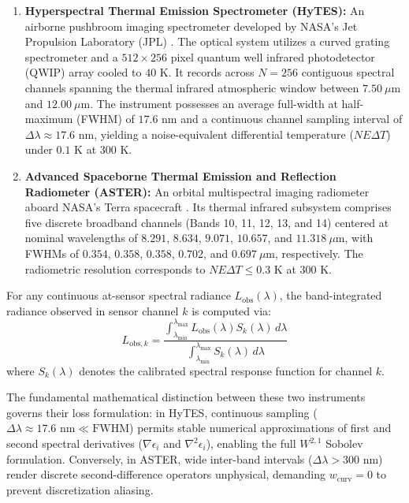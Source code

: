 \documentclass[journal]{IEEEtran}
\begin{document}
\begin{enumerate}
    \item \textbf{Hyperspectral Thermal Emission Spectrometer (HyTES):} An airborne pushbroom imaging spectrometer developed by NASA's Jet Propulsion Laboratory (JPL) \cite{hook2013hyperspectral, hulley2012hytes}. The optical system utilizes a curved grating spectrometer and a $512 \times 256$ pixel quantum well infrared photodetector (QWIP) array cooled to $40\text{ K}$. It records across $N = 256$ contiguous spectral channels spanning the thermal infrared atmospheric window between $7.50\ \mu\text{m}$ and $12.00\ \mu\text{m}$. The instrument possesses an average full-width at half-maximum (FWHM) of $17.6\text{ nm}$ and a continuous channel sampling interval of $\Delta \lambda \approx 17.6\text{ nm}$, yielding a noise-equivalent differential temperature ($NE\Delta T$) under $0.1\text{ K}$ at $300\text{ K}$.

    \item \textbf{Advanced Spaceborne Thermal Emission and Reflection Radiometer (ASTER):} An orbital multispectral imaging radiometer aboard NASA's Terra spacecraft \cite{gillespie1998temperature, baldridge2009aster}. Its thermal infrared subsystem comprises five discrete broadband channels (Bands 10, 11, 12, 13, and 14) centered at nominal wavelengths of $8.291$, $8.634$, $9.071$, $10.657$, and $11.318\ \mu\text{m}$, with FWHMs of $0.354$, $0.358$, $0.358$, $0.702$, and $0.697\ \mu\text{m}$, respectively. The radiometric resolution corresponds to $NE\Delta T \le 0.3\text{ K}$ at $300\text{ K}$.
\end{enumerate}

For any continuous at-sensor spectral radiance $L_{\text{obs}}(\lambda)$, the band-integrated radiance observed in sensor channel $k$ is computed via:
\begin{equation}
L_{\text{obs}, k} = \frac{\int_{\lambda_{\min}}^{\lambda_{\max}} L_{\text{obs}}(\lambda) S_k(\lambda) \, d\lambda}{\int_{\lambda_{\min}}^{\lambda_{\max}} S_k(\lambda) \, d\lambda}
\label{eq:sensor_convolution}
\end{equation}
where $S_k(\lambda)$ denotes the calibrated spectral response function for channel $k$.

The fundamental mathematical distinction between these two instruments governs their loss formulation: in HyTES, continuous sampling ($\Delta \lambda \approx 17.6\text{ nm} \ll \text{FWHM}$) permits stable numerical approximations of first and second spectral derivatives ($\nabla \epsilon_i$ and $\nabla^2 \epsilon_i$), enabling the full $W^{2,1}$ Sobolev formulation. Conversely, in ASTER, wide inter-band intervals ($\Delta \lambda > 300\text{ nm}$) render discrete second-difference operators unphysical, demanding $w_{\text{curv}} = 0$ to prevent discretization aliasing.
\end{document}
